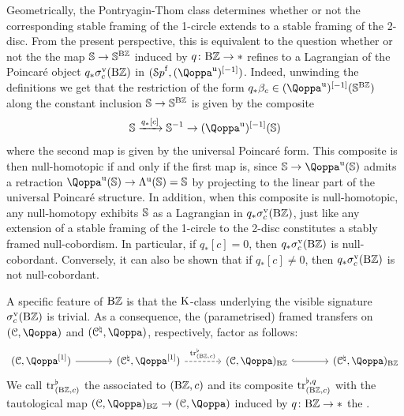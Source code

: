 \begin{remark}
\label{remark:pontryagin}%
Geometrically, the Pontryagin-Thom class determines whether or not 
the corresponding stable framing of the 1-circle extends to a stable framing of the 2-disc. 
From the present perspective, this is equivalent to the question whether or not the the map
$\mathbb{S} \to \mathbb{S}^{\mathrm{B}\mathbb{Z}}$ induced by $q\colon \mathrm{B}\mathbb{Z} \to \ast$ refines to a Lagrangian of the Poincaré object $q_*\sigma^{\mathrm{v}}_c(\mathrm{B}\mathbb{Z})$ in $(\Spaf,(\QF^{\uni})\qshift{-1})$.
Indeed, unwinding the definitions we get that the restriction of the form $q_*\beta_c \in (\QF^{\uni})\qshift{-1}(\SS^{\B\ZZ})$ %
along the constant inclusion $\mathbb{S}\to \mathbb{S}^{\mathrm{B}\mathbb{Z}}$ %
is given by the composite
\[
\SS \xrightarrow{q_*[c]} \SS^{-1} \to (\QF^{\uni})\qshift{-1}(\SS)
\]
where the second map is given by the universal Poincar\'e form. This composite is then null-homotopic if and only if the first map is, since $\SS \to \QF^{\uni}(\SS)$ admits a retraction $\QF^{\uni}(\SS) \to  \Lam^{\uni}(\SS) = \SS$ by projecting to the linear part of the universal Poincaré structure. In addition, when this composite is null-homotopic, any null-homotopy exhibits $\mathbb{S}$ as a Lagrangian in $q_*\sigma^{\mathrm{v}}_c(\mathrm{B}\mathbb{Z})$, just like any extension of a stable framing of the 1-circle to the 2-disc constitutes a stably framed null-cobordism. In particular, if $q_*[c] = 0$, then $q_*\sigma^{\mathrm{v}}_c(\mathrm{B}\mathbb{Z})$ is null-cobordant. Conversely, it can also be shown that if $q_*[c] \neq 0$, then $q_*\sigma^{\mathrm{v}}_c(\mathrm{B}\mathbb{Z})$ is not null-cobordant.
\end{remark}




A specific feature of $\mathrm{B}\mathbb{Z}$ is that the $\operatorname K$-class underlying the visible signature $\sigma^{\mathrm{v}}_c(\mathrm{B}\mathbb{Z})$ is trivial. As a consequence, the (parametrised) framed transfers on $(\C,\QF)$ and $(\C^\natural,\QF)$, respectively, factor as follows:
\[
\begin{tikzcd}[column sep=large]
	(\C,\QF\qshift{1}) \ar[r] & (\C^\natural, \QF\qshift{1}) \ar[r,"{\tr^\flat_{(\B\ZZ,c)}}", dashed] & (\C, \QF)_{\B\ZZ} \ar[r,hook]  & (\C^\natural, \QF)_{\B\ZZ}
\end{tikzcd}
\]
We call $\mathrm{tr}^\flat_{(\mathrm{B}\mathbb{Z},c)}$ the  associated to $(\mathrm{B}\mathbb{Z},c)$ and its composite $\mathrm{tr}^{\flat,q}_{(\mathrm{B}\mathbb{Z},c)}$ with the tautological map $(\C,\QF)_{\B\ZZ} \to (\C,\QF)$ induced by $q \colon \mathrm{B}\mathbb{Z} \to \ast$ the .


